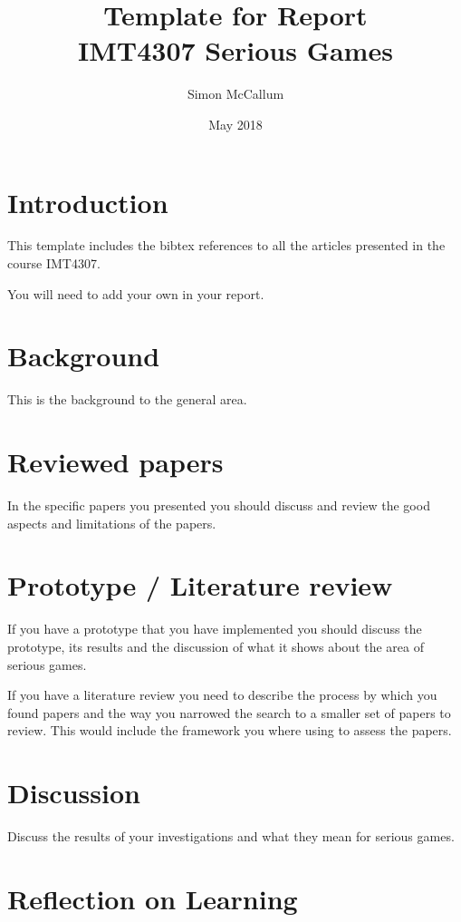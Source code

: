 \documentclass{article}
\title{Template for Report \\IMT4307 Serious Games}
\author{Simon McCallum}
\date{May 2018}
\begin{document}
\maketitle

\section{Introduction}
This template includes the bibtex references to all the articles presented in the course IMT4307.

You will need to add your own in your report.

\section{Background}

This is the background to the general area.

\section{Reviewed papers}

In the specific papers you presented you should discuss and review the good aspects and limitations of the papers.

\section{Prototype / Literature review}

If you have a prototype that you have implemented you should discuss the prototype, its results and the discussion of what it shows about the area of serious games.

If you have a literature review you need to describe the process by which you found papers and the way you narrowed the search to a smaller set of papers to review.  This would include the framework you where using to assess the papers.


\section{Discussion}

Discuss the results of your investigations and what they mean for serious games.

\section{Reflection on Learning}
\end{document}
